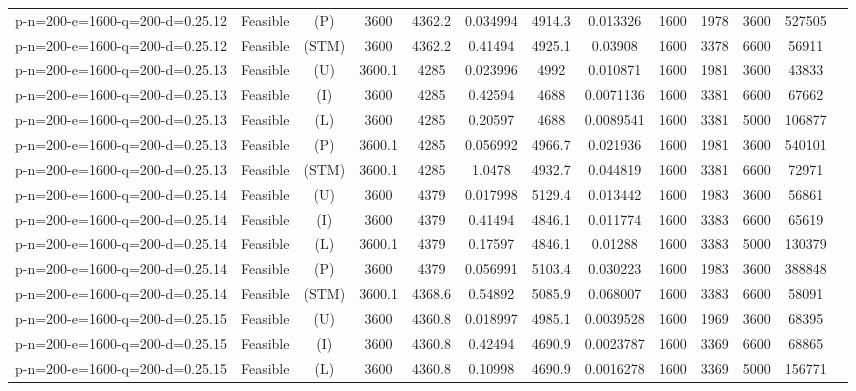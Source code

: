 \documentclass[landscape, a4paper]{article}
\newcommand{\STM}{\ensuremath{\mathrm{STM}}}
\newcommand{\Improved}{\ensuremath{\mathrm{I}}}
\newcommand{\Loose}{\ensuremath{\mathrm{L}}}
\newcommand{\Profit}{\ensuremath{\mathrm{P}}}
\newcommand{\Utility}{\ensuremath{\mathrm{U}}}
\begin{document}
\begin{center}
\begin{tabular}{lcccccccccccc}
p-n=200-e=1600-q=200-d=0.25.12 & Feasible & (\Profit) & 3600 & 4362.2 & 0.034994 & 4914.3 & 0.013326 & 1600 & 1978 & 3600 & 527505 & \\
p-n=200-e=1600-q=200-d=0.25.12 & Feasible & (\STM) & 3600 & 4362.2 & 0.41494 & 4925.1 & 0.03908 & 1600 & 3378 & 6600 & 56911 & \\
p-n=200-e=1600-q=200-d=0.25.13 & Feasible & (\Utility) & 3600.1 & 4285 & 0.023996 & 4992 & 0.010871 & 1600 & 1981 & 3600 & 43833 & \\
p-n=200-e=1600-q=200-d=0.25.13 & Feasible & (\Improved) & 3600 & 4285 & 0.42594 & 4688 & 0.0071136 & 1600 & 3381 & 6600 & 67662 & \\
p-n=200-e=1600-q=200-d=0.25.13 & Feasible & (\Loose) & 3600 & 4285 & 0.20597 & 4688 & 0.0089541 & 1600 & 3381 & 5000 & 106877 & \\
p-n=200-e=1600-q=200-d=0.25.13 & Feasible & (\Profit) & 3600.1 & 4285 & 0.056992 & 4966.7 & 0.021936 & 1600 & 1981 & 3600 & 540101 & \\
p-n=200-e=1600-q=200-d=0.25.13 & Feasible & (\STM) & 3600.1 & 4285 & 1.0478 & 4932.7 & 0.044819 & 1600 & 3381 & 6600 & 72971 & \\
p-n=200-e=1600-q=200-d=0.25.14 & Feasible & (\Utility) & 3600 & 4379 & 0.017998 & 5129.4 & 0.013442 & 1600 & 1983 & 3600 & 56861 & \\
p-n=200-e=1600-q=200-d=0.25.14 & Feasible & (\Improved) & 3600 & 4379 & 0.41494 & 4846.1 & 0.011774 & 1600 & 3383 & 6600 & 65619 & \\
p-n=200-e=1600-q=200-d=0.25.14 & Feasible & (\Loose) & 3600.1 & 4379 & 0.17597 & 4846.1 & 0.01288 & 1600 & 3383 & 5000 & 130379 & \\
p-n=200-e=1600-q=200-d=0.25.14 & Feasible & (\Profit) & 3600 & 4379 & 0.056991 & 5103.4 & 0.030223 & 1600 & 1983 & 3600 & 388848 & \\
p-n=200-e=1600-q=200-d=0.25.14 & Feasible & (\STM) & 3600.1 & 4368.6 & 0.54892 & 5085.9 & 0.068007 & 1600 & 3383 & 6600 & 58091 & \\
p-n=200-e=1600-q=200-d=0.25.15 & Feasible & (\Utility) & 3600 & 4360.8 & 0.018997 & 4985.1 & 0.0039528 & 1600 & 1969 & 3600 & 68395 & \\
p-n=200-e=1600-q=200-d=0.25.15 & Feasible & (\Improved) & 3600 & 4360.8 & 0.42494 & 4690.9 & 0.0023787 & 1600 & 3369 & 6600 & 68865 & \\
p-n=200-e=1600-q=200-d=0.25.15 & Feasible & (\Loose) & 3600 & 4360.8 & 0.10998 & 4690.9 & 0.0016278 & 1600 & 3369 & 5000 & 156771 & \\

\end{tabular}
\end{center}
\end{document}
